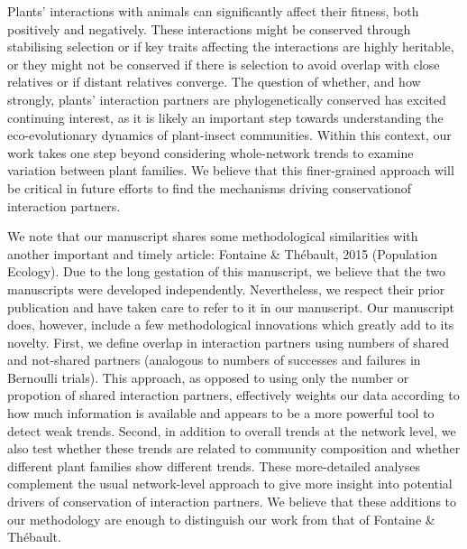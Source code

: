 \documentclass[12pt]{letter}
\begin{document}
\begin{letter}
\begin{enumerate}
		Plants' interactions with animals can significantly affect their fitness, both positively and negatively. These interactions might be conserved through stabilising selection or if key traits affecting the interactions are highly heritable, or they might not be conserved if there is selection to avoid overlap with close relatives or if distant relatives converge. The question of whether, and how strongly, plants' interaction partners are phylogenetically conserved has excited continuing interest, as it is likely an important step towards understanding the eco-evolutionary dynamics of plant-insect communities. Within this context, our work takes one step beyond considering whole-network trends to examine variation between plant families. We believe that this finer-grained approach will be critical in future efforts to find the mechanisms driving conservationof interaction partners.



		\indent We note that our manuscript shares some methodological similarities with another important and timely article: Fontaine \& Th\'{e}bault, 2015 (Population Ecology). Due to the long gestation of this manuscript, we believe that the two manuscripts were developed independently. Nevertheless, we respect their prior publication and have taken care to refer to it in our manuscript. Our manuscript does, however, include a few methodological innovations which greatly add to its novelty. First, we define overlap in interaction partners using numbers of shared and not-shared partners (analogous to numbers of successes and failures in Bernoulli trials). This approach, as opposed to using only the number or propotion of shared interaction partners, effectively weights our data according to how much information is available and appears to be a more powerful tool to detect weak trends. Second, in addition to overall trends at the network level, we also test whether these trends are related to community composition and whether different plant families show different trends. These more-detailed analyses complement the usual network-level approach to give more insight into potential drivers of conservation of interaction partners. We believe that these additions to our methodology are enough to distinguish our work from that of Fontaine \& Th\'{e}bault. 



	\end{enumerate}


\end{letter}
\end{document}
